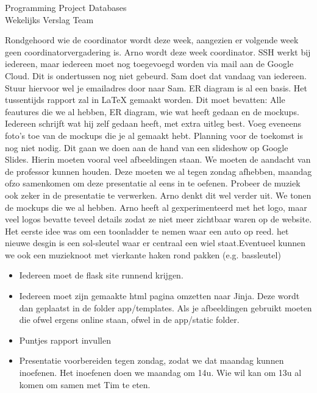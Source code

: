 \documentclass{article}
\newcounter{team}
\begin{document}
\begin{Minutes}{Programming Project Databases \\ Wekelijks Verslag Team }
	
				    Rondgehoord wie de coordinator wordt deze week, aangezien er volgende week geen coordinatorvergadering is. Arno wordt deze week coordinator.
			        SSH werkt bij iedereen, maar iedereen moet nog toegevoegd worden via mail aan de Google Cloud. Dit is ondertussen nog niet gebeurd. Sam doet dat vandaag van iedereen. Stuur hiervoor wel je emailadres door naar Sam.
				    ER diagram is al een basis. Het tussentijds rapport zal in LaTeX gemaakt worden. Dit moet bevatten: Alle feautures die we al hebben, ER diagram, wie wat heeft gedaan en de mockups. Iedereen schrijft wat hij zelf gedaan heeft, met extra uitleg best. Voeg eveneens foto's toe van de mockups die je al gemaakt hebt. Planning voor de toekomst is nog niet nodig. 
				    Dit gaan we doen aan de hand van een slideshow op Google Slides. Hierin moeten vooral veel afbeeldingen staan. We moeten de aandacht van de professor kunnen houden. Deze moeten we al tegen zondag afhebben, maandag ofzo samenkomen om deze presentatie al eens in te oefenen. Probeer de muziek ook zeker in de presentatie te verwerken. Arno denkt dit wel verder uit. We tonen de mockups die we al hebben. 
        		    Arno heeft al gexperimenteerd met het logo, maar veel logos bevatte teveel details zodat ze niet meer zichtbaar waren op de website. Het eerste idee was om een toonladder te nemen waar een auto op reed. het nieuwe desgin is een sol-sleutel waar er centraal een wiel staat.Eventueel kunnen we ook een muzieknoot met vierkante haken rond pakken (e.g. bassleutel)
					
			\begin{itemize}
			\item Iedereen moet de flask site runnend krijgen. 
			\item Iedereen moet zijn gemaakte html pagina omzetten naar Jinja. Deze wordt dan geplaatst in de folder app/templates. Als je afbeeldingen gebruikt moeten die ofwel ergens online staan, ofwel in de app/static folder.
			\item Puntjes rapport invullen 
			\item Presentatie voorbereiden tegen zondag, zodat we dat maandag kunnen inoefenen. Het inoefenen doen we maandag om 14u. Wie wil kan om 13u al komen om samen met Tim te eten.
			\end{itemize}
		

\end{Minutes}
\end{document}
